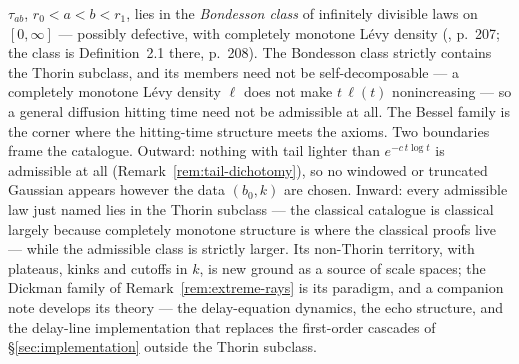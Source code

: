 \begin{remark}
$\tau_{ab}$, $r_0 < a < b < r_1$, lies in the \emph{Bondesson class} of infinitely
divisible laws on $[0,\infty]$ --- possibly defective, with completely monotone
L\'evy density (, p.~207; the class is Definition~2.1
there, p.~208). The Bondesson class strictly contains the Thorin subclass, and its
members need not be self-decomposable --- a completely monotone L\'evy density
$\ell$ does not make $t\,\ell(t)$ nonincreasing --- so a general diffusion hitting
time need not be admissible at all. The Bessel family is the corner where the
hitting-time structure meets the axioms. Two boundaries frame the catalogue. Outward: nothing with tail lighter
than $e^{-c\,t\log t}$ is admissible at all (Remark~\ref{rem:tail-dichotomy}), so
no windowed or truncated Gaussian appears however the data $(b_0,k)$ are chosen.
Inward: every admissible law just named lies in the Thorin subclass --- the classical
catalogue is classical largely because completely monotone structure is where the
classical proofs live --- while the admissible class is strictly larger. Its
non-Thorin territory, with plateaus, kinks and cutoffs in $k$, is new ground as a
source of scale spaces; the Dickman family of Remark~\ref{rem:extreme-rays} is its
paradigm, and a companion note develops its theory --- the delay-equation
dynamics, the echo structure, and the delay-line implementation that replaces the
first-order cascades of \S\ref{sec:implementation} outside the Thorin subclass.
\end{remark}

